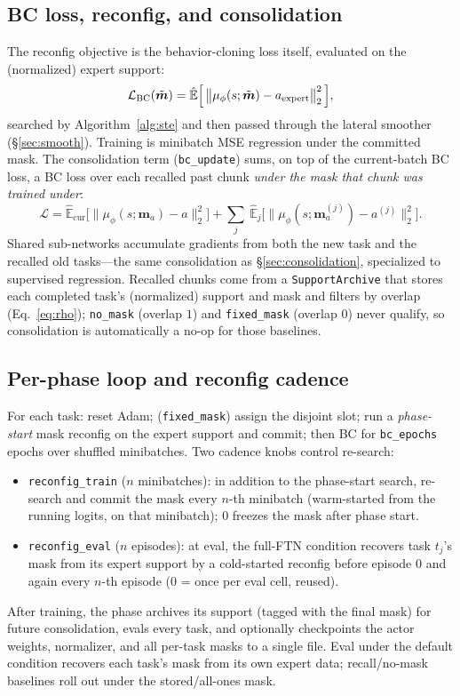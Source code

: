 \documentclass[11pt]{article}
\newcommand{\Ehat}{\hat{\mathbb{E}}}
\newcommand{\obs}{s}
\newcommand{\act}{a}
\newcommand{\mask}{\bm{m}}                 %
\newcommand{\masksoft}{\tilde{\bm{m}}}     %
\newcommand{\code}[1]{\texttt{\small #1}}
\begin{document}
\subsection{BC loss, reconfig, and consolidation}
The reconfig objective is the behavior-cloning loss itself, evaluated on the
(normalized) expert support:
\[
\mathcal L_{\mathrm{BC}}(\masksoft) = \Ehat\Bigl[\,\bigl\|\mu_\phi(\obs;\masksoft) - \act_{\mathrm{expert}}\bigr\|_2^2\,\Bigr],
\]
searched by Algorithm~\ref{alg:ste} and then passed through the lateral smoother
(\S\ref{sec:smooth}). Training is minibatch MSE regression under the committed
mask. The consolidation term (\code{bc\_update}) sums, on top of the current-batch
BC loss, a BC loss over each recalled past chunk \emph{under the mask that chunk
was trained under}:
\[
\mathcal L = \Ehat_{\mathrm{cur}}\bigl[\|\mu_\phi(\obs;\mask_a)-\act\|_2^2\bigr] + \sum_{j}\ \Ehat_{j}\bigl[\|\mu_\phi(\obs;\mask_a^{(j)})-\act^{(j)}\|_2^2\bigr].
\]
Shared sub-networks accumulate gradients from both the new task and the recalled
old tasks---the same consolidation as \S\ref{sec:consolidation}, specialized to
supervised regression. Recalled chunks come from a \code{SupportArchive} that
stores each completed task's (normalized) support and mask and filters by overlap
(Eq.~\eqref{eq:rho}); \code{no\_mask} (overlap $1$) and \code{fixed\_mask}
(overlap $0$) never qualify, so consolidation is automatically a no-op for those
baselines.

\subsection{Per-phase loop and reconfig cadence}
For each task: reset Adam; (\code{fixed\_mask}) assign the disjoint slot; run a
\emph{phase-start} mask reconfig on the expert support and commit; then BC for
\code{bc\_epochs} epochs over shuffled minibatches. Two cadence knobs control
re-search:
\begin{itemize}[leftmargin=1.5em,itemsep=1pt]
  \item \code{reconfig\_train} ($n$ minibatches): in addition to the phase-start
  search, re-search and commit the mask every $n$-th minibatch (warm-started from
  the running logits, on that minibatch); $0$ freezes the mask after phase start.
  \item \code{reconfig\_eval} ($n$ episodes): at eval, the full-FTN condition
  recovers task $t_j$'s mask from its expert support by a cold-started reconfig
  before episode $0$ and again every $n$-th episode ($0$ = once per eval cell,
  reused).
\end{itemize}
After training, the phase archives its support (tagged with the final mask) for
future consolidation, evals every task, and optionally checkpoints the actor
weights, normalizer, and all per-task masks to a single file. Eval under the
default condition recovers each task's mask from its own expert data;
recall/no-mask baselines roll out under the stored/all-ones mask.
\end{document}
